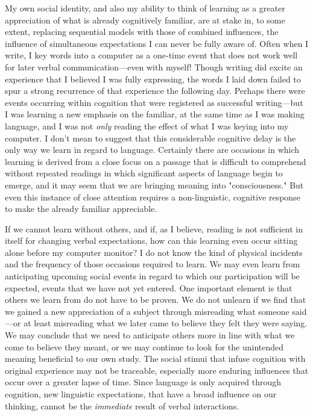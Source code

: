 \documentclass[
]{memoir}
\begin{document}
My own social identity, and also my ability to think of learning as a
greater appreciation of what is already cognitively familiar, are at
stake in, to some extent, replacing sequential models with those of
combined influences, the influence of simultaneous expectations I can
never be fully aware of. Often when I write, I key words into a computer
as a one-time event that does not work well for later verbal
communication---even with myself! Though writing did excite an
experience that I believed I was fully expressing, the words I laid down
failed to spur a strong recurrence of that experience the following day.
Perhaps there were events occurring within cognition that were
registered as successful writing---but I was learning a new emphasis on
the familiar, at the same time as I was making language, and I was not
\emph{only} reading the effect of what I was keying into my computer. I
don't mean to suggest that this considerable cognitive delay is the only
way we learn in regard to language. Certainly there are occasions in
which learning is derived from a close focus on a passage that is
difficult to comprehend without repeated readings in which significant
aspects of language begin to emerge, and it may seem that we are
bringing meaning into "consciousness." But even this instance of close
attention requires a non-linguistic, cognitive response to make the
already familiar appreciable.

If we cannot learn without others, and if, as I believe, reading is not
sufficient in itself for changing verbal expectations, how can this
learning even occur sitting alone before my computer monitor? I do not
know the kind of physical incidents and the frequency of those occasions
required to learn. We may even learn from anticipating upcoming social
events in regard to which our participation will be expected, events
that we have not yet entered. One important element is that others we
learn from do not have to be proven. We do not unlearn if we find that
we gained a new appreciation of a subject through misreading what
someone said---or at least misreading what we later came to believe they
felt they were saying. We may conclude that we need to anticipate others
more in line with what we come to believe they meant, or we may continue
to look for the unintended meaning beneficial to our own study. The
social stimui that infuse cognition with original experience may not be
traceable, especially more enduring influences that occur over a greater
lapse of time. Since language is only acquired through cognition, new
linguistic expectations, that have a broad influence on our thinking,
cannot be the \emph{immediate} result of verbal interactions.
\end{document}
